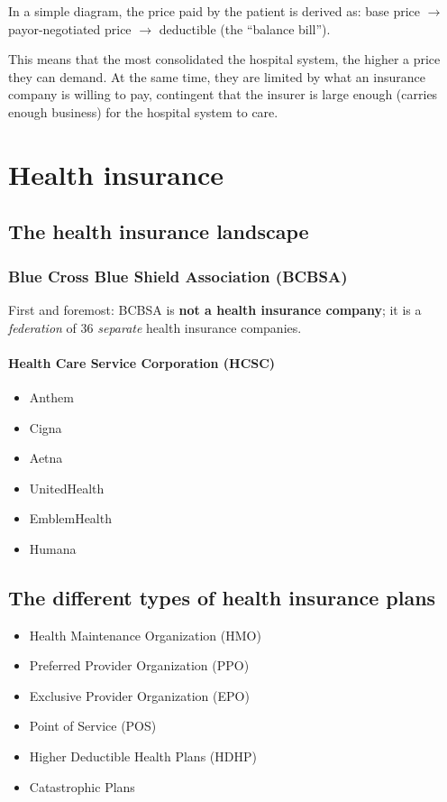 \documentclass{article}
\begin{document}
In a simple diagram, the price paid by the patient is derived as: base price $\rightarrow$ payor-negotiated price $\rightarrow$ deductible (the ``balance bill'').

This means that the most consolidated the hospital system, the higher a price they can demand. At the same time, they are limited by what an insurance company is willing to pay, contingent that the insurer is large enough (carries enough business) for the hospital system to care.

\section{Health insurance}

\subsection{The health insurance landscape}

\subsubsection{Blue Cross Blue Shield Association (BCBSA)}

First and foremost: BCBSA is {\bf not a health insurance company}; it is a {\it federation} of 36 {\it separate} health insurance companies.

\paragraph{Health Care Service Corporation (HCSC)}

\begin{itemize}
\item Anthem
\item Cigna
\item Aetna
\item UnitedHealth
\item EmblemHealth
\item Humana
\end{itemize}

\subsection{The different types of health insurance plans}

\begin{itemize}
\item Health Maintenance Organization (HMO)
\item Preferred Provider Organization (PPO)
\item Exclusive Provider Organization (EPO)
\item Point of Service (POS)
\item Higher Deductible Health Plans (HDHP)
\item Catastrophic Plans
\end{itemize}
\end{document}
